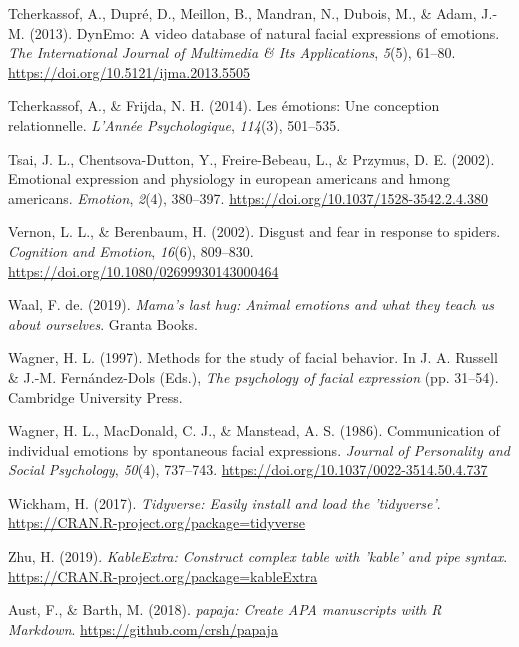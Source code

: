 \documentclass[
  english,
  man]{apa7}
\newlength{\cslhangindent}
\newenvironment{cslreferences}%
  {\setlength{\parindent}{0pt}%
  \everypar{\setlength{\hangindent}{\cslhangindent}}\ignorespaces}%
  {\par}
\begin{document}
\begin{cslreferences}
\leavevmode\hypertarget{ref-tcherkassof2013dynemo}{}%
Tcherkassof, A., Dupré, D., Meillon, B., Mandran, N., Dubois, M., \& Adam, J.-M. (2013). DynEmo: A video database of natural facial expressions of emotions. \emph{The International Journal of Multimedia \& Its Applications}, \emph{5}(5), 61--80. \url{https://doi.org/10.5121/ijma.2013.5505}

\leavevmode\hypertarget{ref-tcherkassof2014emotions}{}%
Tcherkassof, A., \& Frijda, N. H. (2014). Les émotions: Une conception relationnelle. \emph{L'Année Psychologique}, \emph{114}(3), 501--535.

\leavevmode\hypertarget{ref-tsai2002emotional}{}%
Tsai, J. L., Chentsova-Dutton, Y., Freire-Bebeau, L., \& Przymus, D. E. (2002). Emotional expression and physiology in european americans and hmong americans. \emph{Emotion}, \emph{2}(4), 380--397. \url{https://doi.org/10.1037/1528-3542.2.4.380}

\leavevmode\hypertarget{ref-vernon2002disgust}{}%
Vernon, L. L., \& Berenbaum, H. (2002). Disgust and fear in response to spiders. \emph{Cognition and Emotion}, \emph{16}(6), 809--830. \url{https://doi.org/10.1080/02699930143000464}

\leavevmode\hypertarget{ref-de2019mama}{}%
Waal, F. de. (2019). \emph{Mama's last hug: Animal emotions and what they teach us about ourselves}. Granta Books.

\leavevmode\hypertarget{ref-wagner1997methods}{}%
Wagner, H. L. (1997). Methods for the study of facial behavior. In J. A. Russell \& J.-M. Fernández-Dols (Eds.), \emph{The psychology of facial expression} (pp. 31--54). Cambridge University Press.

\leavevmode\hypertarget{ref-wagner1986communication}{}%
Wagner, H. L., MacDonald, C. J., \& Manstead, A. S. (1986). Communication of individual emotions by spontaneous facial expressions. \emph{Journal of Personality and Social Psychology}, \emph{50}(4), 737--743. \url{https://doi.org/10.1037/0022-3514.50.4.737}

\leavevmode\hypertarget{ref-R-tidyverse}{}%
Wickham, H. (2017). \emph{Tidyverse: Easily install and load the 'tidyverse'}. \url{https://CRAN.R-project.org/package=tidyverse}

\leavevmode\hypertarget{ref-R-kableExtra}{}%
Zhu, H. (2019). \emph{KableExtra: Construct complex table with 'kable' and pipe syntax}. \url{https://CRAN.R-project.org/package=kableExtra}

\leavevmode\hypertarget{ref-R-papaja}{}%
Aust, F., \& Barth, M. (2018). \emph{papaja: Create APA manuscripts with R Markdown}. \url{https://github.com/crsh/papaja}


\end{cslreferences}
\end{document}
